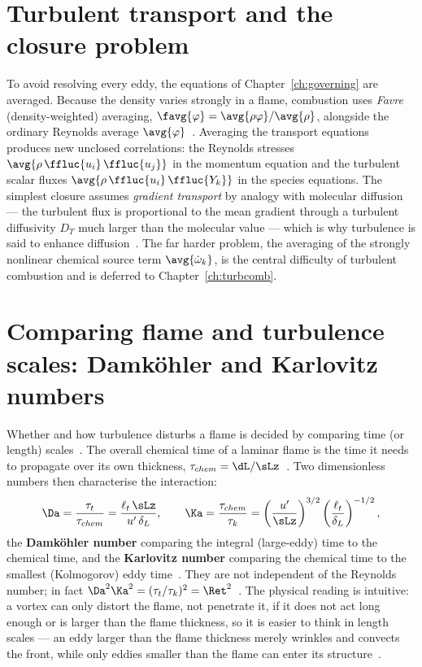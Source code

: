 \section{Turbulent transport and the closure problem}

To avoid resolving every eddy, the equations of Chapter~\ref{ch:governing} are averaged. Because the density varies strongly in a flame, combustion uses \emph{Favre} (density-weighted) averaging, $\favg{\varphi}=\avg{\rho\varphi}/\avg{\rho}$, alongside the ordinary Reynolds average $\avg{\varphi}$~\cite{lecture8,veynante2002turbulent}. Averaging the transport equations produces new unclosed correlations: the Reynolds stresses $\avg{\rho\,\ffluc{u_i}\,\ffluc{u_j}}$ in the momentum equation and the turbulent scalar fluxes $\avg{\rho\,\ffluc{u_i}\,\ffluc{Y_k}}$ in the species equations. The simplest closure assumes \emph{gradient transport} by analogy with molecular diffusion --- the turbulent flux is proportional to the mean gradient through a turbulent diffusivity $D_T$ much larger than the molecular value --- which is why turbulence is said to enhance diffusion~\cite{lecture8,roekaerts2010jmbc}. The far harder problem, the averaging of the strongly nonlinear chemical source term $\avg{\dot\omega_k}$, is the central difficulty of turbulent combustion and is deferred to Chapter~\ref{ch:turbcomb}.

\section{Comparing flame and turbulence scales: Damk\"ohler and Karlovitz numbers}

Whether and how turbulence disturbs a flame is decided by comparing time (or length) scales~\cite{transcript_l9,lecture8}. The overall chemical time of a laminar flame is the time it needs to propagate over its own thickness, $\tau_{chem}=\dL/\sLz$~\cite{lecture8}. Two dimensionless numbers then characterise the interaction:
\begin{equation}
\Da=\frac{\tau_t}{\tau_{chem}}=\frac{\ell_t\,\sLz}{u'\,\delta_L},\qquad
\Ka=\frac{\tau_{chem}}{\tau_k}=\left(\frac{u'}{\sLz}\right)^{3/2}\left(\frac{\ell_t}{\delta_L}\right)^{-1/2},
\label{eq:Da-Ka}
\end{equation}
the \textbf{Damk\"ohler number} comparing the integral (large-eddy) time to the chemical time, and the \textbf{Karlovitz number} comparing the chemical time to the smallest (Kolmogorov) eddy time~\cite{lecture8,transcript_l9}. They are not independent of the Reynolds number; in fact $\Da^2\Ka^2=(\tau_t/\tau_k)^2=\Ret^2$~\cite{lecture8}. The physical reading is intuitive: a vortex can only distort the flame, not penetrate it, if it does not act long enough or is larger than the flame thickness, so it is easier to think in length scales --- an eddy larger than the flame thickness merely wrinkles and convects the front, while only eddies smaller than the flame can enter its structure~\cite{transcript_l9}.

